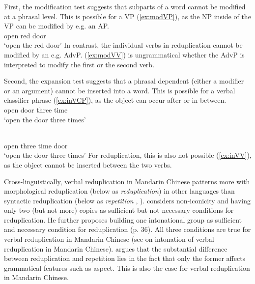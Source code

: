First, the modification test suggests that subparts of a word cannot be modified at a phrasal level.
This is possible for a VP (\ref{ex:modVP}), as the NP inside of the VP can be modified by e.g. an AP.
\ea\label{ex:modVP} %
\gll {}  \\
open  red door\\
\glt `open the red door'
\z
In contrast, the individual verbs in reduplication cannot be modified by an e.g. AdvP.
(\ref{ex:modVV}) is ungrammatical whether the AdvP is interpreted to modify the first or the second verb.
\z


Second, the expansion test suggests that a phrasal dependent (either a modifier or an argument) cannot be inserted into a word.
This is possible for a verbal classifier phrase (\ref{ex:inVCP}), as the object can occur after or in-between.
\ea\label{ex:inVCP}%
\ea \gll {}   \\
open door three time\\
\glt `open the door three times'

\ex  \gll {}    \\
open three time door\\
\glt `open the door three times'
\z\z
For reduplication, this is also not possible (\ref{ex:inVV}), as the object cannot be inserted between the two verbs.
\ea\label{ex:inVV}

\z\z



Cross-linguistically, verbal reduplication in Mandarin Chinese patterns more with morphological reduplication (below as \textit{reduplication}) in other languages
than syntactic reduplication (below as \textit{repetition} \citealt[31]{Gil2005}, \citealt[1--2]{Forza2016}).
\citet[35--36]{Gil2005} considers non-iconicity and having only two (but not more) copies as sufficient but not necessary conditions for reduplication.
He further proposes building one intonational group as sufficient and necessary condition for reduplication (p. 36).
All three conditions are true for verbal reduplication in Mandarin Chinese (see \citealt[154]{Sui2018} on intonation of verbal reduplication in Mandarin Chinese).
\citet[9]{Forza2016} argues that the substantial difference between reduplication and repetition lies in the fact that only the former affects grammatical features such as aspect.
This is also the case for verbal reduplication in Mandarin Chinese.

